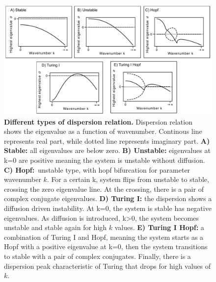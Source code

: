 \begin{figure}[H] %
    \centering
    \includegraphics[width=1\textwidth]{chapters/Chapter 1/dispersions} %
    \caption{\textbf{Different types of dispersion relation.} Dispersion relation shows the eigenvalue as a function of wavenumber. Continous line represents real part, while dotted line represents imaginary part. \textbf{A) Stable:} all eigenvalues are below zero. \textbf{B) Unstable:} eigenvalues at k=0 are positive meaning the system is unstable without diffusion. \textbf{C) Hopf:}~unstable type, with hopf bifurcation for parameter wavenumber $k$. For a certain k, system flips from unstable to stable, crossing the zero eigenvalue line. At the crossing, there is a pair of complex conjugate eigenvalues. \textbf{D) Turing I:} the dispersion shows a diffusion driven instability. At k=0, the system is stable has negative eigenvalues. As diffusion is introduced, k>0, the system becomes unstable and stable again for high $k$ values. \textbf{E) Turing I Hopf:} a combination of Turing I and Hopf, meaning the system starts as a Hopf with a positive eigenvalue at k=0, then the system transitions to stable with a pair of complex conjugates. Finally, there is a dispersion peak characteristic of Turing that drops for high values of $k$.}
    \label{fig:dispersions} %
\end{figure}


